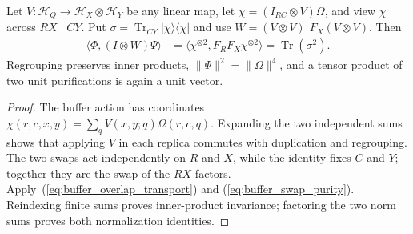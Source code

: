 \begin{theorem}
    \label{thm:physical_buffer_regrouped_purity}
    \leanok
    Let $V:\mathcal H_Q\to\mathcal H_X\otimes\mathcal H_Y$ be any linear
    map, let $\chi=(I_{RC}\otimes V)\Omega$, and view $\chi$ across
    $RX\mid CY$. Put $\sigma=\operatorname{Tr}_{CY}
    \vert\chi\rangle\langle\chi\vert$ and use
    $W=(V\otimes V)^\dagger F_X(V\otimes V)$. Then
    \begin{align}
        \langle\Phi,(I\otimes W)\Psi\rangle
        &=\langle\chi^{\otimes2},F_RF_X\chi^{\otimes2}\rangle
         =\operatorname{Tr}(\sigma^2).
        \label{eq:buffer_regrouped_purity}
    \end{align}
    Regrouping preserves inner products, $\|\Psi\|^2=\|\Omega\|^4$, and
    a tensor product of two unit purifications is again a unit vector.
\end{theorem}
\begin{proof}\leanok
    The buffer action has coordinates
    $\chi(r,c,x,y)=\sum_q V(x,y;q)\Omega(r,c,q)$.
    Expanding the two independent sums shows that applying $V$ in each
    replica commutes with duplication and regrouping. The two swaps act
    independently on $R$ and $X$, while the identity fixes $C$ and $Y$;
    together they are the swap of the $RX$ factors.
    Apply~(\ref{eq:buffer_overlap_transport}) and
    (\ref{eq:buffer_swap_purity}). Reindexing finite sums proves inner-product
    invariance; factoring the two norm sums proves both normalization identities.
\end{proof}

